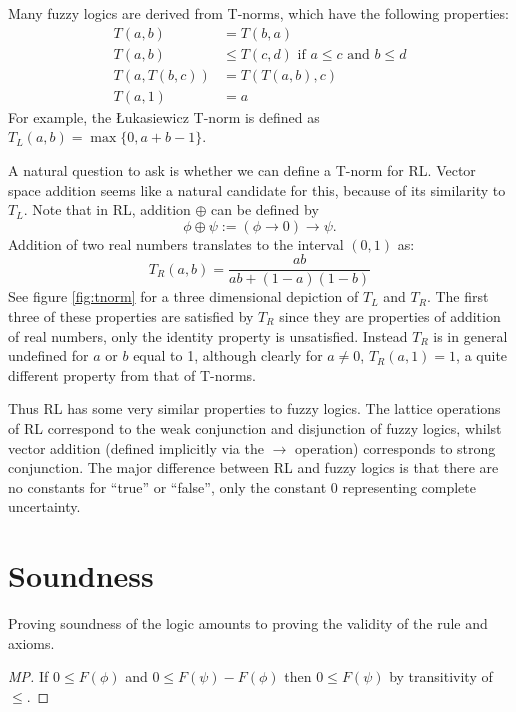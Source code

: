\documentclass[journal]{IEEEtran}
\theoremstyle{definition}
\begin{document}
Many fuzzy logics are derived from T-norms, which have the following
properties:
\begin{align}
\tag{Commutativity} T(a, b) &= T(b, a) \\
\tag{Monotonicity} T(a, b) &\le T(c, d) \text{ if } a \le c  \text{ and } b \le d\\
\tag{Associativity} T(a, T(b, c)) &= T(T(a, b), c)\\
\tag{Identity} T(a, 1) &= a
\end{align}
For example, the \L ukasiewicz T-norm is defined as $T_L(a,b) =
\max\{0,a + b - 1\}$.

A natural question to ask is whether we can define a T-norm for
RL. Vector space addition seems like a natural candidate for this,
because of its similarity to $T_L$. Note that in RL, addition $\oplus$
can be defined by
$$\phi \oplus \psi := (\phi \rightarrow 0) \rightarrow \psi.$$
Addition of two real numbers translates to the interval $(0,1)$ as:
$$T_R(a, b) = \frac{ab}{ab + (1-a)(1-b)}$$
See figure \ref{fig:tnorm} for a three dimensional depiction of $T_L$
and $T_R$. The first three of these properties are satisfied by $T_R$
since they are properties of addition of real numbers, only the
identity property is unsatisfied. Instead $T_R$ is in general
undefined for $a$ or $b$ equal to 1, although clearly for $a \neq 0$,
$T_R(a,1) = 1$, a quite different property from that of T-norms.

Thus RL has some very similar properties to fuzzy logics. The lattice
operations of RL correspond to the weak conjunction and disjunction of
fuzzy logics, whilst vector addition (defined implicitly via the
$\rightarrow$ operation) corresponds to strong conjunction. The major
difference between RL and fuzzy logics is that there are no constants
for ``true'' or ``false'', only the constant 0 representing complete
uncertainty.

\section{Soundness}

Proving soundness of the logic amounts to proving the validity of the
rule and axioms.


\begin{proof}[MP]
If $0 \le F(\phi)$ and $0 \le F(\psi) - F(\phi)$ then
$0 \le F(\psi)$ by transitivity of $\le$.
\end{proof}
\end{document}
